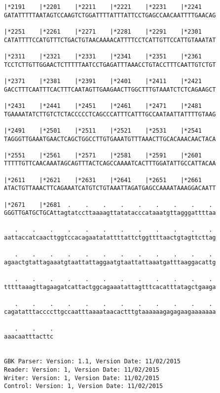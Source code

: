 \documentclass{article}
\begin{document}
\begin{Verbatim}
|*2191    |*2201    |*2211    |*2221    |*2231    |*2241    
GATATTTTTAATAGTCCAAGTCTGGATTTTATTTATTCCTGAGCCAACAATTTTGAACAG
                                                            
|*2251    |*2261    |*2271    |*2281    |*2291    |*2301    
CATATTTTCCATGTTTCTGACTGTAACAAAACATTTTCCTCATTGTTCCATTGTAAATAT
                                                            
|*2311    |*2321    |*2331    |*2341    |*2351    |*2361    
TCCTCTTGTTGGAACTCTTTTTAATCCTGAGATTTAAACCTGTACCTTTCAATTGTCTGT
                                                            
|*2371    |*2381    |*2391    |*2401    |*2411    |*2421    
GACCTTTCAATTTCACTTTCAATAGTTGAAGAACTTGGCTTTGTAAATCTCTCAGAAGCT
                                                            
|*2431    |*2441    |*2451    |*2461    |*2471    |*2481    
TGAAAATATCTTGTCTCTACCCCCTCAGCCCATTTCATTTGCCAATAATTATTTTGTAAG
                                                            
|*2491    |*2501    |*2511    |*2521    |*2531    |*2541    
TAGGGTTGAAATGAACTCAGCTGGCCTTGTGAAATGTTTAAACTTGCACAAACAACTACA
                                                            
|*2551    |*2561    |*2571    |*2581    |*2591    |*2601    
TTTTTGTTCAACAAATAGCAGTTTACTCAGCCAAAATCACTTTGGATATTGCCATTACAA
                                                            
|*2611    |*2621    |*2631    |*2641    |*2651    |*2661    
ATACTGTTAAACTTCAGAAATCATGTCTGTAAATTAGATGAGCCAAAATAAAGGACAATT
                                                            
|*2671    |*2681  .    .    .    .    .    .    .    .    . 
GGGTTGATGCTGCAttagtatccttaaaagttatatacccataaatgttagggattttaa
                                                            
   .    .    .    .    .    .    .    .    .    .    .    . 
aattaccatcaacttggtccacagaatatattttattctggttttaactgtagttcttag
                                                            
   .    .    .    .    .    .    .    .    .    .    .    . 
agaactgtattagaaatgtaattattaggaatgtaattattaaatgatttaaggacattg
                                                            
   .    .    .    .    .    .    .    .    .    .    .    . 
tttttaaagttagaagatcattactggcagaaatattagtttcacatttatagctgaaga
                                                            
   .    .    .    .    .    .    .    .    .    .    .    . 
cagatatttaccccttgccaatttaaaataacactttgtaaaaaagagagaagaaaaaaa
                                                            
   .    .    .
aaacaatttacttc
              
              
GBK Parser: Version: 1.1, Version Date: 11/02/2015
Reader: Version: 1, Version Date: 11/02/2015
Writer: Version: 1, Version Date: 11/02/2015
Control: Version: 1, Version Date: 11/02/2015
\end{Verbatim}
\end{document}
